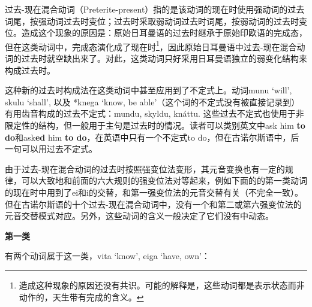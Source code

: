 过去-现在混合动词（Preterite-present）指的是该动词的现在时使用强动词的过去词尾，按强动词过去时变位；过去时采取弱动词过去时词尾，按弱动词的过去时变位。造成这个现象的原因是：原始日耳曼语的过去时继承于原始印欧语的完成态，但在这类动词中，完成态演化成了现在时\footnote{造成这种现象的原因还没有共识。可能的解释是，这些动词都是表示状态而非动作的，天生带有完成的含义。}，因此原始日耳曼语中过去-现在混合动词的过去时就空缺出来了。对此，这类动词只好采用日耳曼语独立的弱变化结构来构成过去时。

这种新的过去时构成法在这类动词中甚至应用到了不定式上。动词munu `will‌',
skulu `shall‌', 以及 *knega `know, be
able‌'（这个词的不定式没有被直接记录到）有用齿音构成的过去不定式：mundu,
skyldu, knáttu.
这些过去不定式也使用于非限定性的结构，但一般用于主句是过去时的情况。读者可以类别英文中ask
him \textbf{to do}和ask\textbf{ed} him \textbf{to
  do}，在英语中只有一个不定式to
do，但在古诺尔斯语中，后一句可以用过去不定式。

由于过去-现在混合动词的过去时按照强变位法变形，其元音变换也有一定的规律，可以大致地和前面的六大规则的强变位法对等起来，例如下面的的第一类动词的现在时中用到了ei和i的交替，和第一强变位法的元音交替有关（不完全一致）。但在古诺尔斯语的十个过去-现在混合动词中，没有一个和第二或第六强变位法的元音交替模式对应。另外，这些动词的含义一般决定了它们没有中动态。

\textbf{第一类}

有两个动词属于这一类，vita `know‌', eiga `have, own‌'：


